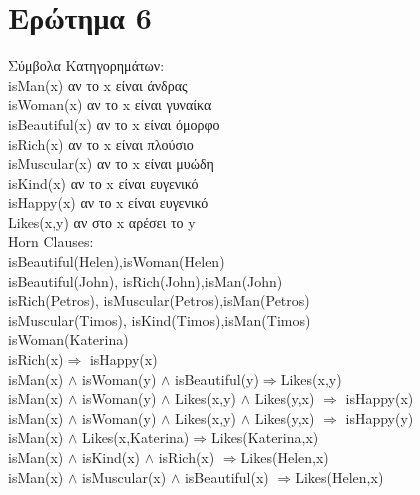 \documentclass[12pt,a4paper]{article}
\begin{document}
\section*{Ερώτημα 6}
Σύμβολα Κατηγορημάτων: \\
\textlatin{isMan(x)} αν το \textlatin{x} είναι άνδρας\\
\textlatin{isWoman(x)} αν το \textlatin{x} είναι γυναίκα\\
\textlatin{isBeautiful(x)} αν το \textlatin{x} είναι όμορφο\\
\textlatin{isRich(x)} αν το \textlatin{x} είναι πλούσιο\\
\textlatin{isMuscular(x)} αν το \textlatin{x} είναι μυώδη\\
\textlatin{isKind(x)} αν το \textlatin{x} είναι ευγενικό\\
\textlatin{isHappy(x)} αν το \textlatin{x} είναι ευγενικό\\
\textlatin{Likes(x,y)} αν στο \textlatin{x} αρέσει το \textlatin{y}\vspace{5mm}\\
\textlatin{Horn Clauses:}\vspace{3mm}\\
\textlatin{isBeautiful(Helen),\textlatin{isWoman(Helen)}}\\
\textlatin{isBeautiful(John)}, \textlatin{isRich(John)},\textlatin{isMan(John)}\\
\textlatin{isRich(Petros)}, \textlatin{isMuscular(Petros)},\textlatin{isMan(Petros)}\\
\textlatin{isMuscular(Timos)}, \textlatin{isKind(Timos)},\textlatin{isMan(Timos)}\\
\textlatin{isWoman(Katerina)}\\
\textlatin{isRich(x)$\Rightarrow$ isHappy(x)}\\
\textlatin{isMan(x) $\wedge$ isWoman(y) $\wedge$ isBeautiful(y)$\Rightarrow$Likes(x,y)}\\
\textlatin{isMan(x) $\wedge$ isWoman(y) $\wedge$ Likes(x,y) $\wedge$ Likes(y,x) $\Rightarrow$ isHappy(x)}\\
\textlatin{isMan(x) $\wedge$ isWoman(y) $\wedge$ Likes(x,y) $\wedge$ Likes(y,x) $\Rightarrow$ isHappy(y)}\\
\textlatin{isMan(x) $\wedge$ Likes(x,Katerina)$\Rightarrow$Likes(Katerina,x)}\\
\textlatin{isMan(x) $\wedge$ isKind(x) $\wedge$ isRich(x) $\Rightarrow$Likes(Helen,x)}\\
\textlatin{isMan(x) $\wedge$ isMuscular(x) $\wedge$ isBeautiful(x) $\Rightarrow$Likes(Helen,x)}\vspace{5mm}\\
\end{document}
